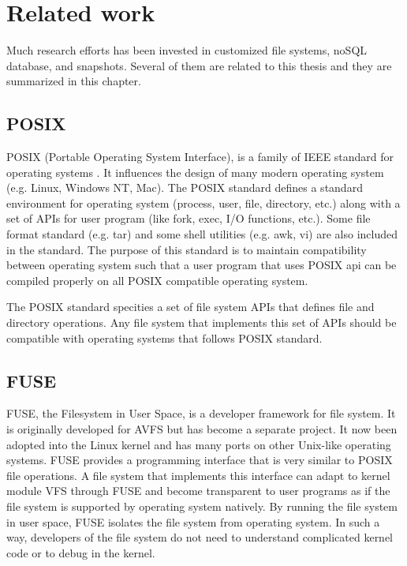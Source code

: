 \chapter{Related work}
\label{chap:related_work}

    Much research efforts has been invested in customized file systems, noSQL database, and snapshots. Several of them are related to this thesis and they are summarized in this chapter.

\section{POSIX}

    POSIX (Portable Operating System Interface), is a family of IEEE standard for operating systems \cite{posix_wiki}. It influences the design of many modern operating system (e.g. Linux, Windows NT, Mac). The POSIX standard defines a standard environment for operating system (process, user, file, directory, etc.) along with a set of APIs for user program (like fork, exec, I/O functions, etc.)\cite{posix}. Some file format standard (e.g. tar) and some shell utilities (e.g. awk, vi) are also included in the standard. The purpose of this standard is to maintain compatibility between operating system such that a user program that uses POSIX api can be compiled properly on all POSIX compatible operating system.

    The POSIX standard specities a set of file system APIs that defines file and directory operations. Any file system that implements this set of APIs should be compatible with operating systems that follows POSIX standard.

\section{FUSE}

    FUSE, the Filesystem in User Space, is a developer framework for file system. It is originally developed for AVFS but has become a separate project. It now been adopted into the Linux kernel and has many ports on other Unix-like operating systems. FUSE provides a programming interface that is very similar to POSIX file operations. A file system that implements this interface can adapt to kernel module VFS through FUSE and become transparent to user programs as if the file system is supported by operating system natively. By running the file system in user space, FUSE isolates the file system from operating system. In such a way, developers of the file system do not need to understand complicated kernel code or to debug in the kernel. \cite{fuse}

